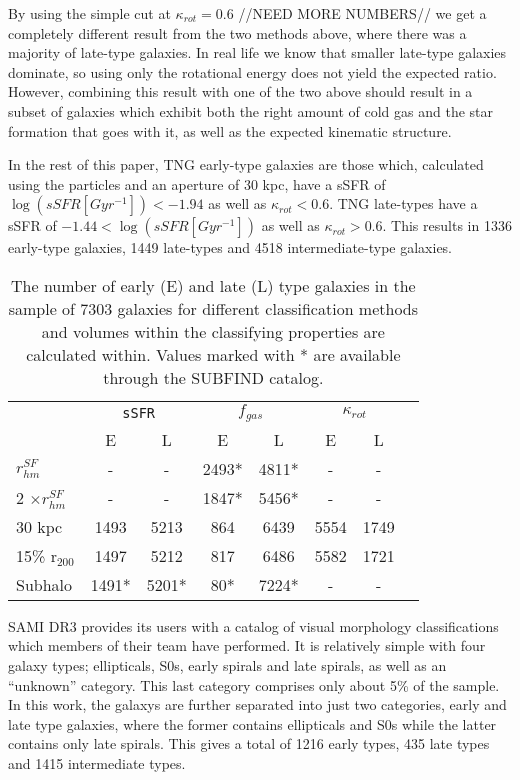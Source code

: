 By using the simple cut at $\kappa_{rot} = 0.6$ //NEED MORE NUMBERS// we get a completely different result from the two methods above, where there was a majority of late-type galaxies. In real life we know that smaller late-type galaxies dominate, so using only the rotational energy does not yield the expected ratio. However, combining this result with one of the two above should result in a subset of galaxies which exhibit both the right amount of cold gas and the star formation that goes with it, as well as the expected kinematic structure.

In the rest of this paper, TNG early-type galaxies are those which, calculated using the particles and an aperture of 30 kpc, have a sSFR of $\log (sSFR[Gyr^{-1}]) < -1.94$ as well as $\kappa_{rot} < 0.6$. TNG late-types have a sSFR of $ -1.44 < \log (sSFR[Gyr^{-1}]) $ as well as $\kappa_{rot} > 0.6$. This results in 1336 early-type galaxies, 1449 late-types and 4518 intermediate-type galaxies.

\begin{table}
\begin{center}
\caption{The number of early (E) and late (L) type galaxies in the sample of 7303 galaxies for different classification methods and volumes within the classifying properties are calculated within. Values marked with * are available through the SUBFIND catalog.}
 \label{morph}
\begin{tabular}{ l| c c c c c c c } 
 \hline
 \hline
   &\multicolumn{2}{c}{\texttt{sSFR}}&\multicolumn{2}{c}{$f_{gas}$}&\multicolumn{2}{c}{$\kappa_{rot}$}\\
   &  E & L & E & L & E & L \\
 \hline
 $r_{hm}^{SF}$ & - & - & 2493* & 4811* & - & - \\ 
 2 $\times r_{hm}^{SF}$ & - & - & 1847* & 5456* & - & - \\ 
 30 kpc & 1493 & 5213 & 864 & 6439 & 5554 & 1749 \\ 
 15\% r$_{200}$ & 1497 & 5212 & 817 & 6486 & 5582 & 1721 \\ 
 Subhalo & 1491* & 5201* & 80* & 7224* & - & - \\ 
 \hline 
 \end{tabular}
\end{center}
\end{table}

SAMI DR3 provides its users with a catalog of visual morphology classifications which members of their team have performed. It is relatively simple with four galaxy types; ellipticals, S0s, early spirals and late spirals, as well as an ``unknown'' category. This last category comprises only about 5\% of the sample. In this work, the galaxys are further separated into just two categories, early and late type galaxies, where the former contains ellipticals and S0s while the latter contains only late spirals. This gives a total of 1216 early types, 435 late types and 1415 intermediate types.